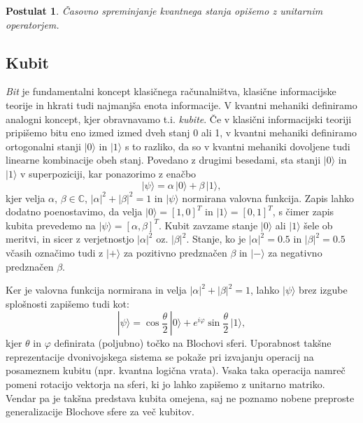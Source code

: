 \documentclass[12pt]{article}
\newtheorem{postulat}{Postulat}
\begin{document}
\begin{postulat}
Časovno spreminjanje kvantnega stanja opišemo z unitarnim operatorjem.
\end{postulat}


\subsection{Kubit}
\label{kubit} 

\emph{Bit} je fundamentalni koncept klasičnega računalništva, klasične informacijske teorije in hkrati tudi najmanjša enota informacije. V kvantni mehaniki definiramo analogni koncept, kjer obravnavamo t.i. \emph{kubite}. Če v klasični informacijski teoriji pripišemo bitu eno izmed izmed dveh stanj 0 ali 1, v kvantni mehaniki definiramo ortogonalni stanji $| 0 \rangle$ in $| 1 \rangle$ s to razliko, da so v kvantni mehaniki dovoljene tudi linearne kombinacije obeh stanj. Povedano z drugimi besedami, sta stanji $| 0 \rangle$ in $| 1 \rangle$ v superpoziciji, kar ponazorimo z enačbo
%
\begin{equation}
| \psi \rangle = \alpha \, | 0 \rangle + \beta \, | 1 \rangle,
\end{equation}
%
kjer velja $\alpha$, $\beta \in \mathbb{C}$, $|\alpha|^2 + |\beta|^2 = 1$ in $| \psi \rangle$ normirana valovna funkcija. Zapis lahko dodatno poenostavimo, da velja $| 0 \rangle = [1,0]^T$ in $| 1 \rangle = [0,1]^T$, s čimer zapis kubita prevedemo na $| \psi \rangle = [\alpha, \beta]^T$.  Kubit zavzame stanje $| 0 \rangle$ ali $| 1 \rangle$ šele ob meritvi, in sicer z verjetnostjo $|\alpha|^2$ oz. $|\beta|^2$. Stanje, ko je $|\alpha|^2 = 0.5$ in $|\beta|^2 = 0.5$ včasih označimo tudi z $| + \rangle$ za pozitivno predznačen $\beta$ in $| - \rangle$ za negativno predznačen $\beta$. \cite{nielsenQuantumComputationQuantum2012} \par Ker je valovna funkcija normirana in velja $|\alpha|^2 + |\beta|^2 = 1$, lahko $| \psi \rangle$ brez izgube splošnosti zapišemo tudi kot:
\begin{equation}
\label{blocheq}
| \psi \rangle = \cos{\frac{\theta}{2}} \, | 0 \rangle + e^{i \varphi} \sin{\frac{\theta}{2}} \, | 1 \rangle,
\end{equation}
kjer $\theta$ in $\varphi$ definirata (poljubno) točko na Blochovi sferi. Uporabnost takšne reprezentacije dvonivojskega sistema se pokaže pri izvajanju operacij na posameznem kubitu (npr. kvantna logična vrata). Vsaka taka operacija namreč pomeni rotacijo vektorja na sferi, ki jo lahko zapišemo z unitarno matriko. Vendar pa je takšna predstava kubita omejena, saj ne poznamo nobene preproste generalizacije Blochove sfere za več kubitov. \cite{nielsenQuantumComputationQuantum2012}
\end{document}
